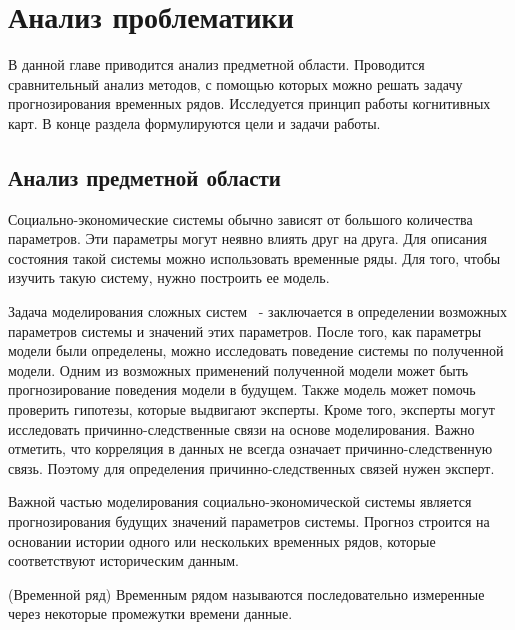

\chapter{Анализ проблематики }
\label{chapter1}

\begin{annotation}
	В данной главе приводится анализ предметной области.
	Проводится сравнительный анализ методов, с помощью которых
	можно решать задачу прогнозирования временных рядов.
	Исследуется принцип работы когнитивных карт.
	В конце раздела формулируются цели и задачи работы.
\end{annotation}


\section{Анализ предметной области}

Социально-экономические системы обычно зависят от большого количества параметров.
Эти параметры могут неявно влиять друг на друга. Для описания состояния такой системы
можно использовать временные ряды. Для того, чтобы изучить такую систему, нужно построить ее модель.

Задача моделирования сложных систем ~- заключается в определении возможных параметров
системы и значений этих параметров. После того, как параметры модели были определены,
можно исследовать поведение системы по полученной модели. Одним из возможных
применений полученной модели может быть прогнозирование поведения модели в будущем.
Также модель может помочь проверить гипотезы, которые выдвигают эксперты.
Кроме того, эксперты могут исследовать причинно-следственные связи на основе моделирования.
Важно отметить, что корреляция в данных не всегда означает причинно-следственную связь.
Поэтому для определения причинно-следственных связей нужен эксперт.

Важной частью моделирования социально-экономической системы является
прогнозирования будущих значений параметров системы. Прогноз строится на основании
истории одного или нескольких временных рядов, которые соответствуют историческим данным.

\begin{definition}
	(Временной ряд)
	Временным рядом называются последовательно измеренные через некоторые промежутки времени данные.
\end{definition}

